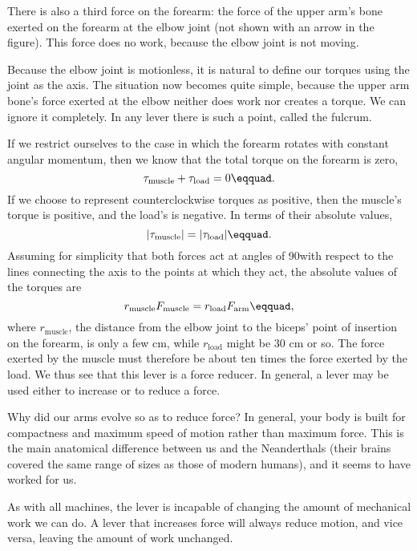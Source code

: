 There is also a third force on the forearm: the force of the
upper arm's bone exerted on the forearm at the elbow joint
(not shown with an arrow in the figure). This force does no
work, because the elbow joint is not moving.

Because the elbow joint is motionless, it is natural to
define our torques using the joint as the axis. The
situation now becomes quite simple, because the upper arm
bone's force exerted at the elbow neither does work nor
creates a torque. We can ignore it completely. In any lever
there is such a point, called the fulcrum.

If we restrict ourselves to the case in which the forearm
rotates with constant angular momentum, then we know that
the total torque on the forearm is zero,
\begin{equation*}
                \tau_\text{muscle} + \tau_\text{load}  =  0\eqquad.
\end{equation*}
 If we choose to represent counterclockwise torques as
positive, then the muscle's torque is positive, and the
load's is negative. In terms of their absolute values,
\begin{equation*}
                |\tau_\text{muscle}|  =  |\tau_\text{load}|\eqquad.
\end{equation*}
Assuming for simplicity that both forces act at angles of
90\degunit with respect to the lines connecting the axis to the
points at which they act, the absolute values of the torques are
\begin{equation*}
                r_\text{muscle} F_\text{muscle}  =  r_\text{load} F_\text{arm}\eqquad,
\end{equation*}
where $r_\text{muscle}$, the distance from the elbow joint to the
biceps' point of insertion on the forearm, is only a few cm,
while $r_\text{load}$ might be 30 cm or so. The force exerted by
the muscle must therefore be about ten times the force
exerted by the load. We thus see that this lever is a force
reducer. In general, a lever may be used either to increase
or to reduce a force.

Why did our arms evolve so as to reduce force? In general,
your body is built for compactness and maximum speed of
motion rather than maximum force. This is the main
anatomical difference between us and the Neanderthals
(their brains covered the same range of sizes as those of
modern humans), and it seems to have worked for us.

As with all machines, the lever is incapable of changing the
amount of mechanical work we can do. A lever that increases
force will always reduce motion, and vice versa, leaving the
amount of work unchanged.

